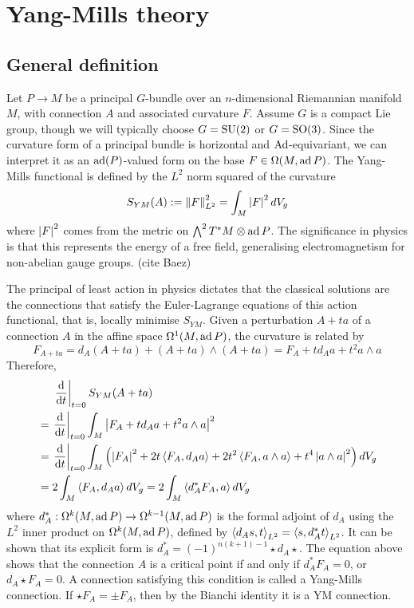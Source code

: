 \section{Yang-Mills theory}
\subsection{General definition}
Let $P\to M$ be a principal $G$-bundle over an $n$-dimensional Riemannian 
manifold $M$, with connection $A$ and associated curvature $F$. 
Assume $G$ is a compact Lie group,
though we will typically choose $G=\operatorname{SU}(2)$ or $G=\operatorname{SO}(3)$. 
Since the curvature form of a principal bundle is horizontal and  
$\operatorname{Ad}$-equivariant, we can interpret it as an $\operatorname{ad}(P)$-valued form on the base 
$F\in\Omega(M,\operatorname{ad} P)$.
The Yang-Mills functional is defined by the $L^2$ norm squared of the curvature 
\[
	S_{YM}(A) := \norm{F}^2_{L^2} = \int_M \abs{F}^2 dV_g
\]
where $\abs{F}^2$ comes from the metric on $\bigwedge^2T^*M\otimes \operatorname{ad} P$. 
The significance in physics is that this represents the energy of a free field, 
generalising electromagnetism for non-abelian gauge groups.  
(cite Baez)

The principal of least action in physics dictates that the classical solutions
are the connections that satisfy the Euler-Lagrange equations of this action 
functional, that is, locally minimise $S_{YM}$. Given a perturbation
$A+ta$ of a connection  $A$ in the affine space $\Omega^1(M,\operatorname{ad} P)$, the 
curvature is related by
\[
F_{A+ta} = d_A(A+ta) + (A+ta)\wedge (A+ta) = F_A + td_A a + t^2a\wedge a
\] 
Therefore,
\begin{align*}
	&\quad\;\odv{}{t}_{t=0}S_{YM}(A+ta)\\
	&= \odv{}{t}_{t=0} \int_M \abs{F_A + td_A a + t^2a\wedge a}^2 \\
	&= \odv{}{t}_{t=0} \int_M \paren{\abs{F_A}^2 + 2t\gen{F_A,d_A a} 
	+ 2t^2\gen{F_A,a\wedge a} + t^4 \abs{a\wedge a}^2} dV_g \\
	&=  2\int_M  \gen{F_A,d_A a}  dV_g 
	=  2\int_M  \gen{d_A^*F_A, a}  dV_g 
\end{align*}
where $d_A^* :\Omega^{k}(M,\operatorname{ad} P)\to \Omega^{k-1}(M,\operatorname{ad} P)$ is the formal adjoint of 
$d_A$ using the $L^2$ inner product on
$\Omega^k(M,\operatorname{ad} P)$, defined by $\gen{d_A s, t}_{L^2} = \gen{s,d_A^*t}_{L^2}$.
It can be shown that its explicit form is $d_A^* = (-1)^{n(k+1)-1}\star d_A \star$.
The equation above shows that the connection $A$ is a critical point if and only
if  $d_A^* F_A = 0$, or $d_A \star F_A = 0$. A connection satisfying this
condition is called a Yang-Mills connection.
If $\star F_A = \pm F_A$, then by the Bianchi identity it is a YM connection.


